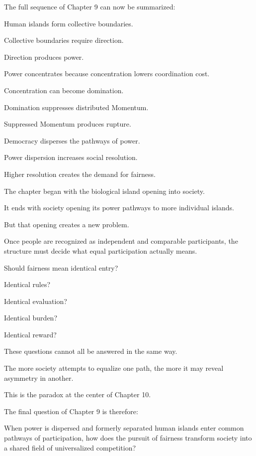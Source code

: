 The full sequence of Chapter 9 can now be summarized:

Human islands form collective boundaries.

Collective boundaries require direction.

Direction produces power.

Power concentrates because concentration lowers coordination cost.

Concentration can become domination.

Domination suppresses distributed Momentum.

Suppressed Momentum produces rupture.

Democracy disperses the pathways of power.

Power dispersion increases social resolution.

Higher resolution creates the demand for fairness.

The chapter began with the biological island opening into society.

It ends with society opening its power pathways to more individual islands.

But that opening creates a new problem.

Once people are recognized as independent and comparable participants, the structure must decide what equal participation actually means.

Should fairness mean identical entry?

Identical rules?

Identical evaluation?

Identical burden?

Identical reward?

These questions cannot all be answered in the same way.

The more society attempts to equalize one path, the more it may reveal asymmetry in another.

This is the paradox at the center of Chapter 10.

The final question of Chapter 9 is therefore:

When power is dispersed and formerly separated human islands enter common pathways of participation, how does the pursuit of fairness transform society into a shared field of universalized competition?